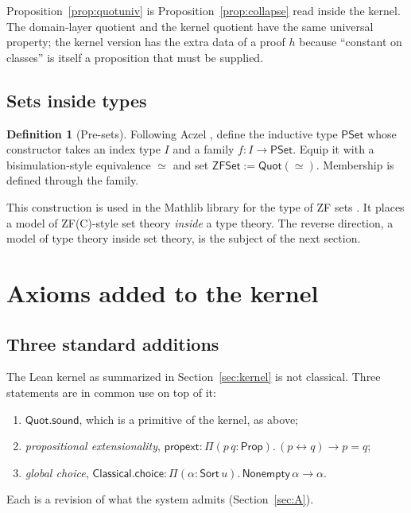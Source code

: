 \documentclass[11pt]{article}
\newcommand{\Sort}{\mathsf{Sort}}
\newcommand{\Prop}{\mathsf{Prop}}
\newcommand{\Quot}{\mathsf{Quot}}
\theoremstyle{definition}
\newtheorem{definition}{Definition}[section]
\theoremstyle{plain}
\theoremstyle{remark}
\begin{document}
Proposition~\ref{prop:quotuniv} is Proposition~\ref{prop:collapse} read inside the kernel. The domain-layer quotient and the kernel quotient have the same universal property; the kernel version has the extra data of a proof $h$ because ``constant on classes'' is itself a proposition that must be supplied.

\subsection{Sets inside types}

\begin{definition}[Pre-sets]\label{def:preset}
Following Aczel \cite{Aczel78}, define the inductive type $\mathsf{PSet}$ whose constructor takes an index type $I$ and a family $f:I\to\mathsf{PSet}$. Equip it with a bisimulation-style equivalence $\simeq$ and set $\mathsf{ZFSet}:=\Quot(\simeq)$. Membership is defined through the family.
\end{definition}

This construction is used in the Mathlib library for the type of ZF sets \cite{Mathlib20}. It places a model of ZF(C)-style set theory \emph{inside} a type theory. The reverse direction, a model of type theory inside set theory, is the subject of the next section.

\section{Axioms added to the kernel}\label{sec:axioms}

\subsection{Three standard additions}

The Lean kernel as summarized in Section~\ref{sec:kernel} is not classical. Three statements are in common use on top of it:
\begin{enumerate}[label=(\roman*)]
\item $\Quot.\mathsf{sound}$, which is a primitive of the kernel, as above;
\item \emph{propositional extensionality}, $\mathsf{propext}:\Pi(p\,q:\Prop).\,(p\leftrightarrow q)\to p=q$;
\item \emph{global choice}, $\mathsf{Classical.choice}:\Pi(\alpha:\Sort\,u).\,\mathsf{Nonempty}\,\alpha\to\alpha$.
\end{enumerate}
Each is a revision of what the system admits (Section~\ref{sec:A}).
\end{document}

